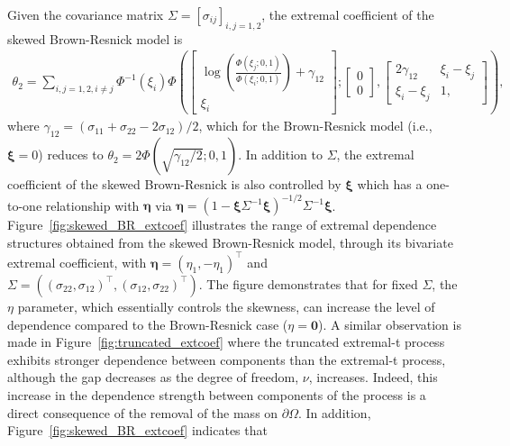 \documentclass[lineno]{biometrika}
\begin{document}
Given the covariance matrix $\Sigma = \left[ \sigma_{ij}\right]_{i,j=1,2}$, the extremal coefficient of the skewed Brown-Resnick model is
%
\begin{align}
\label{eq:bi_extcoef_skewed_BR}
\theta_2 = \sum_{i,j=1,2,i\neq j}\Phi^{-1}(\xi_i)
\Phi\left(
\begin{bmatrix} 
\log\left(\frac{\Phi(\xi_j;0,1)}{\Phi(\xi_i;0,1)}\right) + \gamma_{12} \\ 
\xi_i 
\end{bmatrix};
\begin{bmatrix}
0 \\ 0
\end{bmatrix},
\begin{bmatrix}
2\gamma_{12} & \xi_i - \xi_j \\ \xi_i - \xi_j & 1,
\end{bmatrix}\right), 
\end{align}
%
where $\gamma_{12} = (\sigma_{11} + \sigma_{22} -2\sigma_{12})/2$, which for the Brown-Resnick model (i.e., $\bm \xi = 0$) reduces to $\theta_2 = 2 \Phi(\sqrt{\gamma_{12}/2}; 0, 1)$. In addition to $\Sigma$, the extremal coefficient of the skewed Brown-Resnick is also controlled by $\bm\xi$ which has a one-to-one relationship with $\bm\eta$ via $\bm\eta = (1-\bm \xi \Sigma^{-1} \bm\xi)^{-1/2}\Sigma^{-1}\bm\xi$.
%
Figure~\ref{fig:skewed_BR_extcoef} illustrates the range of extremal dependence structures obtained from the skewed Brown-Resnick model, through its bivariate extremal coefficient, with $\bm\eta = (\eta_1,-\eta_1)^\top$ and $\Sigma = ((\sigma_{22},\sigma_{12})^\top,(\sigma_{12},\sigma_{22})^\top)$. The figure demonstrates that for fixed $\Sigma$, the $\eta$ parameter, which essentially controls the skewness, can increase the level of dependence compared to the Brown-Resnick case ($\eta=\bm 0$). A similar observation is made in Figure~\ref{fig:truncated_extcoef} where the truncated extremal-t process exhibits stronger dependence between components than the extremal-t process, although the gap decreases as the degree of freedom, $\nu$, increases. Indeed, this increase in the dependence strength between components of the process is a direct consequence of the removal of the mass on $\partial\Omega$. In addition, Figure~\ref{fig:skewed_BR_extcoef} indicates that 
\end{document}
